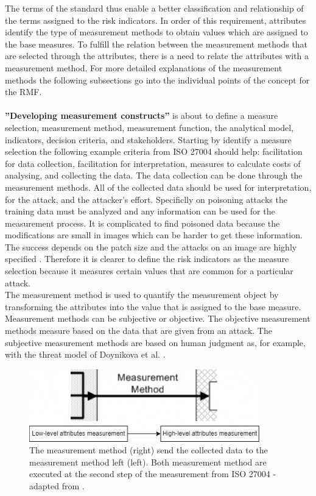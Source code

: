 The terms of the standard thus enable a better classification and relationship of the terms assigned to the risk indicators. In order of this requirement, attributes identify the type of measurement methods to obtain values which are assigned to the base measures. To fulfill the relation between the measurement methods that are selected through the attributes, there is a need to relate the attributes with a measurement method. For more detailed explanations of the measurement methods the following subsections go into the individual points of the concept for the RMF. \\ \\

\textbf{''Developing measurement constructs''} is about to define a measure selection, measurement method, measurement function, the analytical model, indicators, decision criteria, and stakeholders. Starting by identify a measure selection the following example criteria from ISO 27004 should help: facilitation for data collection, facilitation for interpretation, measures to calculate costs of analysing, and collecting the data. The data collection can be done through the measurement methods. All of the collected data should be used for interpretation, for the attack, and the attacker's effort. Specificlly on poisoning attacks the training data must be analyzed and any information can be used for the measurement process. It is complicated to find poisoned data because the modifications are small in images which can be harder to get these information. The success depends on the patch size and the attacks on an image are highly specified \cite{DBLP:conf/icml/SchwarzschildGG21}. Therefore it is clearer to define the risk indicators as the measure selection because it measures certain values that are common for a particular attack. \\ The measurement method is used to quantify the measurement object by transforming the attributes into the value that is assigned to the base measure. Measurement methods can be subjective or objective. The objective measurement methods measure based on the data that are given from an attack. The subjective measurement methods are based on human judgment as, for example, with the threat model of Doynikova et al. \cite{DBLP:conf/crisis/DoynikovaNGK20}.

\begin{figure}[ht!]
  \centering
  \includegraphics[width=10cm]{pictures/measurement_methods.png}
  \caption{The measurement method (right) send the collected data to the measurement method left (left). Both measurement method are executed at the second step of the measurement from ISO 27004 -  adapted from \cite{ISO_27004_2009}.}
  \label{fig:measurement_methods}
\end{figure}

